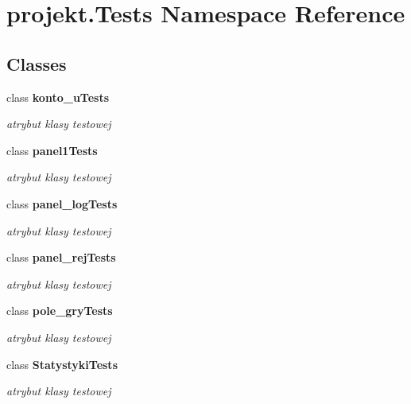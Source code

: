 \section{projekt.\+Tests Namespace Reference}
\label{namespaceprojekt_1_1Tests}
\subsection*{Classes}
\begin{DoxyCompactItemize}
\item 
class \textbf{ konto\+\_\+u\+Tests}
\begin{DoxyCompactList}\small\item\em atrybut klasy testowej \end{DoxyCompactList}\item 
class \textbf{ panel1\+Tests}
\begin{DoxyCompactList}\small\item\em atrybut klasy testowej \end{DoxyCompactList}\item 
class \textbf{ panel\+\_\+log\+Tests}
\begin{DoxyCompactList}\small\item\em atrybut klasy testowej \end{DoxyCompactList}\item 
class \textbf{ panel\+\_\+rej\+Tests}
\begin{DoxyCompactList}\small\item\em atrybut klasy testowej \end{DoxyCompactList}\item 
class \textbf{ pole\+\_\+gry\+Tests}
\begin{DoxyCompactList}\small\item\em atrybut klasy testowej \end{DoxyCompactList}\item 
class \textbf{ Statystyki\+Tests}
\begin{DoxyCompactList}\small\item\em atrybut klasy testowej \end{DoxyCompactList}\end{DoxyCompactItemize}
